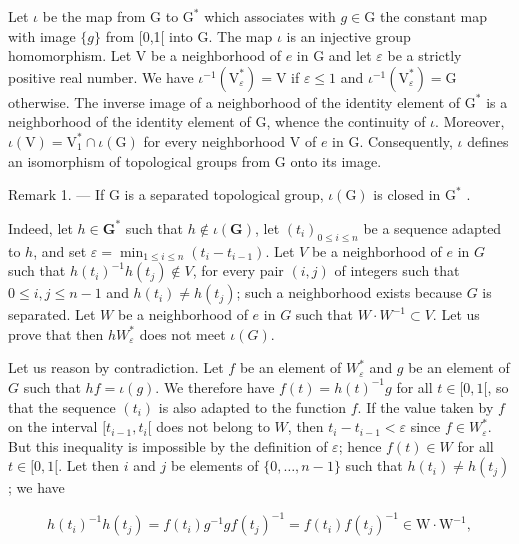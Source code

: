 Let \(\iota\) be the map from G to \(\mathrm{G}^*\) which associates with \(g\in \mathrm{G}\) the constant map with image \(\{g\}\) from [0,1[ into G. The map \(\iota\) is an injective group homomorphism. Let V be a neighborhood of \(e\) in G and let \(\varepsilon\) be a strictly positive real number. We have \(\iota^{-1}(\mathrm{V}_{\varepsilon}^{*}) = \mathrm{V}\) if \(\varepsilon \leqslant 1\) and \(\iota^{-1}(\mathrm{V}_{\varepsilon}^{*}) = \mathrm{G}\) otherwise. The inverse image of a neighborhood of the identity element of \(\mathrm{G}^*\) is a neighborhood of the identity element of G, whence the continuity of \(\iota\). Moreover, \(\iota(\mathrm{V}) = \mathrm{V}_1^* \cap \iota(\mathrm{G})\) for every neighborhood V of \(e\) in G. Consequently, \(\iota\) defines an isomorphism of topological groups from G onto its image.

Remark 1. --- If G is a separated topological group, \(\iota(\mathrm{G})\) is closed in \(\mathrm{G}^*\) .

Indeed, let \(h \in \mathbf{G}^*\) such that \(h \notin \iota(\mathbf{G})\), let \((t_i)_{0 \leqslant i \leqslant n}\) be a sequence adapted to \(h\), and set \(\varepsilon = \min_{1 \leqslant i \leqslant n} (t_i - t_{i-1})\). Let \(V\) be a neighborhood of \(e\) in \(G\) such that \(h(t_i)^{-1}h(t_j) \notin V\), for every pair \((i,j)\) of integers such that \(0 \leqslant i, j \leqslant n-1\) and \(h(t_i) \neq h(t_j)\); such a neighborhood exists because \(G\) is separated. Let \(W\) be a neighborhood of \(e\) in \(G\) such that \(W \cdot W^{-1} \subset V\). Let us prove that then \(hW_\varepsilon^*\) does not meet \(\iota(G)\).

Let us reason by contradiction. Let \(f\) be an element of \(W_{\varepsilon}^{*}\) and \(g\) be an element of \(G\) such that \(hf = \iota(g)\). We therefore have \(f(t) = h(t)^{-1}g\) for all \(t \in [0,1[\), so that the sequence \((t_i)\) is also adapted to the function \(f\). If the value taken by \(f\) on the interval \([t_{i-1}, t_i[\) does not belong to \(W\), then \(t_i - t_{i-1} < \varepsilon\) since \(f \in W_{\varepsilon}^{*}\). But this inequality is impossible by the definition of \(\varepsilon\); hence \(f(t) \in W\) for all \(t \in [0,1[\). Let then \(i\) and \(j\) be elements of \(\{0, \ldots, n-1\}\) such that \(h(t_i) \neq h(t_j)\); we have

\[
h (t _ {i}) ^ {- 1} h (t _ {j}) = f (t _ {i}) g ^ {- 1} g f (t _ {j}) ^ {- 1} = f (t _ {i}) f (t _ {j}) ^ {- 1} \in \mathrm{W} \cdot \mathrm{W} ^ {- 1},
\]

